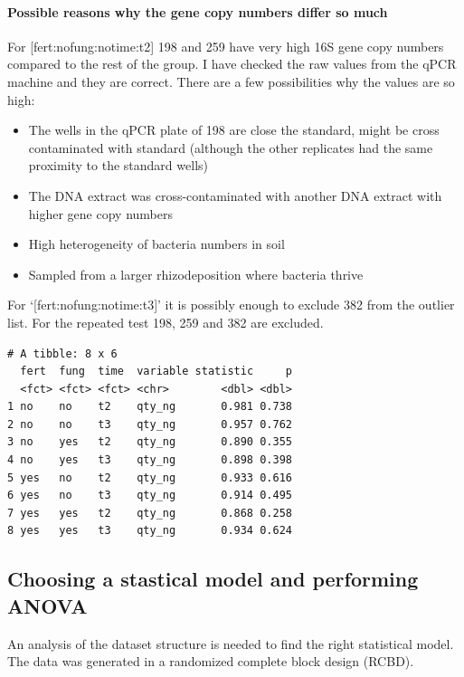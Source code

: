 \documentclass[twoside,12pt,final]{ucthesis-CA2012}
\providecommand{\tightlist}{%
  \setlength{\itemsep}{0pt}\setlength{\parskip}{0pt}}
\begin{document}
\begin{ucmainmatter}
\hypertarget{possible-reasons-why-the-gene-copy-numbers-differ-so-much}{%
\paragraph{Possible reasons why the gene copy numbers differ so much}\label{possible-reasons-why-the-gene-copy-numbers-differ-so-much}}

For {[}fert:no\textbar fung:no\textbar time:t2{]} 198 and 259 have very high 16S gene copy numbers compared to the rest of the group. I have checked the raw values from the qPCR machine and they are correct. There are a few possibilities why the values are so high:
\begin{itemize}
\tightlist
\item
  The wells in the qPCR plate of 198 are close the standard, might be cross contaminated with standard (although the other replicates had the same proximity to the standard wells)
\item
  The DNA extract was cross-contaminated with another DNA extract with higher gene copy numbers
\item
  High heterogeneity of bacteria numbers in soil
\item
  Sampled from a larger rhizodeposition where bacteria thrive
\end{itemize}
For `{[}fert:no\textbar fung:no\textbar time:t3{]}' it is possibly enough to exclude 382 from the outlier list. For the repeated test 198, 259 and 382 are excluded.
\begin{verbatim}
# A tibble: 8 x 6
  fert  fung  time  variable statistic     p
  <fct> <fct> <fct> <chr>        <dbl> <dbl>
1 no    no    t2    qty_ng       0.981 0.738
2 no    no    t3    qty_ng       0.957 0.762
3 no    yes   t2    qty_ng       0.890 0.355
4 no    yes   t3    qty_ng       0.898 0.398
5 yes   no    t2    qty_ng       0.933 0.616
6 yes   no    t3    qty_ng       0.914 0.495
7 yes   yes   t2    qty_ng       0.868 0.258
8 yes   yes   t3    qty_ng       0.934 0.624
\end{verbatim}
\hypertarget{choosing-a-stastical-model-and-performing-anova}{%
\subsection{Choosing a stastical model and performing ANOVA}\label{choosing-a-stastical-model-and-performing-anova}}

An analysis of the dataset structure is needed to find the right statistical model. The data was generated in a randomized complete block design (RCBD).


\end{ucmainmatter}
\end{document}
